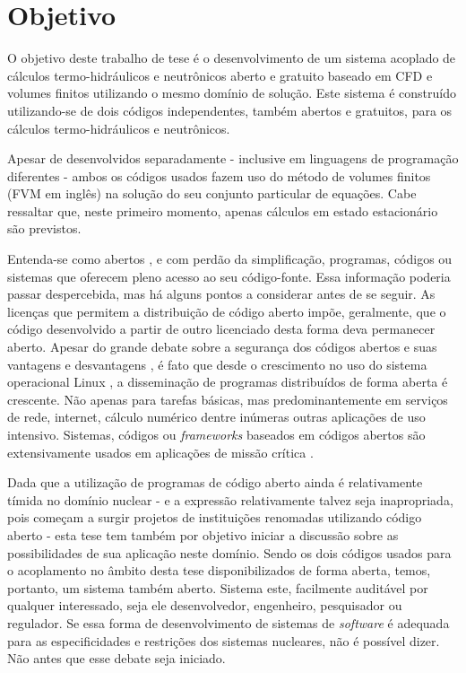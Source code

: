 \section{Objetivo}

O objetivo deste trabalho de tese é o desenvolvimento de um sistema acoplado de cálculos
termo-hidráulicos e neutrônicos aberto e gratuito baseado em CFD e volumes finitos utilizando
o mesmo domínio de solução. Este sistema é construído utilizando-se de dois códigos independentes, também
abertos e gratuitos, para os cálculos termo-hidráulicos e neutrônicos. 

Apesar de desenvolvidos separadamente - inclusive
em linguagens de programação diferentes - ambos os códigos usados fazem uso do método de volumes
finitos \cite{Eymard2003} (FVM em inglês) na solução do seu conjunto particular de equações.
Cabe ressaltar que, neste primeiro momento, apenas cálculos em estado estacionário
são previstos.

Entenda-se como abertos \cite[Capítulo~3]{Stallman2002}, e com perdão da simplificação, programas, códigos ou sistemas
que oferecem pleno acesso ao seu código-fonte. Essa informação poderia passar despercebida,
mas há alguns pontos a considerar antes de se
seguir. As licenças que permitem a distribuição de código aberto impõe, geralmente, que
o código desenvolvido a partir de outro licenciado desta forma deva permanecer aberto.
Apesar do grande debate sobre a segurança dos códigos abertos e suas vantagens e desvantagens \cite[Seção~2.6]{Androutsellis2010},
é fato que desde o crescimento no uso do sistema operacional Linux \cite{LinuxBritannica}, a disseminação
de programas distribuídos de forma aberta é crescente.
Não apenas para tarefas básicas, mas predominantemente em serviços de rede, internet, cálculo numérico dentre
inúmeras outras aplicações de uso intensivo. Sistemas, códigos ou \textit{frameworks} baseados em códigos abertos são
extensivamente usados em aplicações de missão crítica \cite{Norris2004}.

Dada que a utilização de programas de código aberto ainda é relativamente tímida no domínio nuclear
- e a expressão relativamente talvez seja inapropriada, pois começam a surgir projetos de instituições
renomadas utilizando código aberto \cite{Romano2013, Boyd2014, Huff2016} -
esta tese tem também por objetivo iniciar a discussão sobre as possibilidades de sua
aplicação neste domínio. Sendo os dois códigos usados para o acoplamento no âmbito desta tese disponibilizados
de forma aberta, temos, portanto, um sistema também aberto. Sistema este, facilmente auditável
por qualquer interessado, seja ele desenvolvedor, engenheiro, pesquisador ou regulador.
Se essa forma de desenvolvimento de sistemas de \textit{software} é adequada para as especificidades
e restrições dos sistemas nucleares, não é possível dizer. Não antes que esse debate
seja iniciado.

